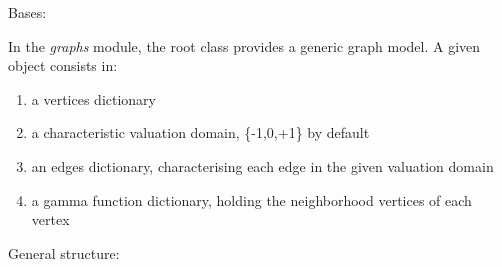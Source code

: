 \documentclass[letterpaper,10pt,english]{sphinxmanual}
\begin{document}
\begin{fulllineitems}
\label{techDoc:graphs.Graph}
Bases: \href{http://docs.python.org/library/functions.html\#object}{}

In the \emph{graphs} module, the root {\hyperref[techDoc:graphs.Graph]{\emph{}}} class provides a generic graph model. A given object consists in:
\begin{enumerate}
\item {} 
a vertices dictionary

\item {} 
a characteristic valuation domain, \{-1,0,+1\} by default

\item {} 
an edges dictionary, characterising each edge in the given valuation domain

\item {} 
a gamma function dictionary, holding the neighborhood vertices of each vertex

\end{enumerate}

General structure:


\end{fulllineitems}
\end{document}

